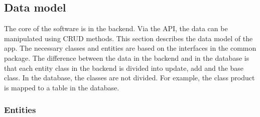     \subsection*{Data model}
    The core of the software is in the backend. Via the API, the data can be manipulated using CRUD methods. This section describes the data model of the app. The necessary classes and entities are based on the interfaces in the common package. The difference between the data in the backend and in the database is that each entity class in the backend is divided into update, add and the base class. In the database, the classes are not divided. For example, the class product is mapped to a table in the database.
    
    \subsubsection*{Entities} %
